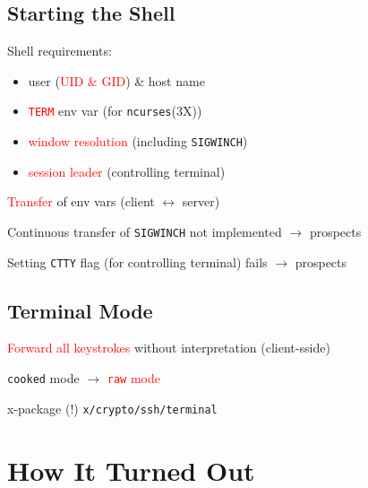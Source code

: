 \documentclass[
	xcolor=dvipsnames,
	handout
]{beamer}
\newenvironment{zhawframe}[1][]
{\begin{frame}[environment=fr,#1]{\insertsubsectionhead}{\insertsectionhead}}
{\end{frame}
}
\begin{document}
\subsection{Starting the Shell}
\begin{zhawframe}
 Shell requirements:

	\begin{itemize}
	\item user (\textcolor{red}{UID \& GID}) \& host name
	\item \textcolor{red}{\texttt{TERM}} env var (for \texttt{ncurses}(3X))
	\item \textcolor{red}{window resolution} (including \texttt{SIGWINCH})
	\item \textcolor{red}{session leader} (controlling terminal)
	\end{itemize}
	
 \textcolor{red}{Transfer} of env vars (client $\leftrightarrow$ server)

 Continuous transfer of \texttt{SIGWINCH} not implemented $\rightarrow$ prospects

 Setting \texttt{CTTY} flag (for controlling terminal) fails $\rightarrow$ prospects
\end{zhawframe}

\subsection{Terminal Mode}
\begin{zhawframe}
 \textcolor{red}{Forward all keystrokes} without interpretation (client-sside)

 \texttt{cooked} mode $\rightarrow$ \textcolor{red}{\texttt{raw} mode}

 x-package (!) \texttt{x/crypto/ssh/terminal}
\end{zhawframe}

\section{How It Turned Out}
\end{document}
